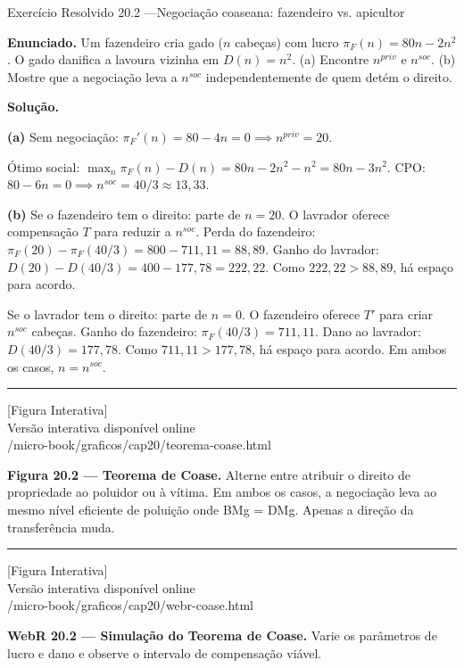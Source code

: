 \documentclass[11pt,twoside,openright]{book}
\newcommand{\figurePlaceholder}[1]{%
  \begin{center}
    \begin{tcolorbox}[
      width=0.85\textwidth,
      colback=graybg,
      colframe=gray,
      boxrule=0.5pt,
      arc=2pt,
      halign=center,
      valign=center,
      height=5cm
    ]
      \centering
      \vfill
      {\sffamily\color{gray}\large [Figura Interativa]}\\[6pt]
      {\sffamily\small\color{gray} Versão interativa disponível online}\\[4pt]
      {\ttfamily\tiny\color{gray} #1}
      \vfill
    \end{tcolorbox}
  \end{center}
}
\begin{document}
\begin{exresolvidobox}{Exercício Resolvido 20.2 —Negociação coaseana: fazendeiro vs. apicultor}

\textbf{Enunciado.} Um fazendeiro cria gado (\(n\) cabeças) com lucro
\(\pi_F(n) = 80n - 2n^2\). O gado danifica a lavoura vizinha em
\(D(n) = n^2\). (a) Encontre \(n^{priv}\) e \(n^{soc}\). (b) Mostre que
a negociação leva a \(n^{soc}\) independentemente de quem detém o
direito.

\textbf{Solução.}

\textbf{(a)} Sem negociação:
\(\pi_F'(n) = 80 - 4n = 0 \implies n^{priv} = 20\).

Ótimo social:
\(\max_n \pi_F(n) - D(n) = 80n - 2n^2 - n^2 = 80n - 3n^2\). CPO:
\(80 - 6n = 0 \implies n^{soc} = 40/3 \approx 13{,}33\).

\textbf{(b)} Se o fazendeiro tem o direito: parte de \(n = 20\). O
lavrador oferece compensação \(T\) para reduzir a \(n^{soc}\). Perda do
fazendeiro: \(\pi_F(20) - \pi_F(40/3) = 800 - 711{,}11 = 88{,}89\).
Ganho do lavrador: \(D(20) - D(40/3) = 400 - 177{,}78 = 222{,}22\). Como
\(222{,}22 > 88{,}89\), há espaço para acordo.

Se o lavrador tem o direito: parte de \(n = 0\). O fazendeiro oferece
\(T'\) para criar \(n^{soc}\) cabeças. Ganho do fazendeiro:
\(\pi_F(40/3) = 711{,}11\). Dano ao lavrador: \(D(40/3) = 177{,}78\).
Como \(711{,}11 > 177{,}78\), há espaço para acordo. Em ambos os casos,
\(n = n^{soc}\).

\end{exresolvidobox}

\begin{center}\rule{0.5\linewidth}{0.5pt}\end{center}

\figurePlaceholder{/micro-book/graficos/cap20/teorema-coase.html}

\textbf{Figura 20.2 --- Teorema de Coase.} Alterne entre atribuir o
direito de propriedade ao poluidor ou à vítima. Em ambos os casos, a
negociação leva ao mesmo nível eficiente de poluição onde BMg = DMg.
Apenas a direção da transferência muda.

\begin{center}\rule{0.5\linewidth}{0.5pt}\end{center}

\figurePlaceholder{/micro-book/graficos/cap20/webr-coase.html}

\textbf{WebR 20.2 --- Simulação do Teorema de Coase.} Varie os
parâmetros de lucro e dano e observe o intervalo de compensação viável.
\end{document}
